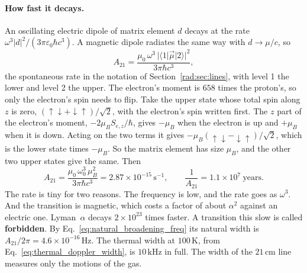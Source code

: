 \paragraph{How fast it decays.} An oscillating electric dipole of matrix element $d$ decays at the rate $\omega^3|d|^2/(3\pi\varepsilon_0\hbar c^3)$. A magnetic dipole radiates the same way with $d\to\mu/c$, so
\[
A_{21}=\frac{\mu_0\,\omega^3\,|\langle1|\vec\mu|2\rangle|^2}{3\pi\hbar c^3},
\]
the spontaneous rate in the notation of Section~\ref{rad:sec:lines}, with level 1 the lower and level 2 the upper. The electron's moment is $658$ times the proton's, so only the electron's spin needs to flip. Take the upper state whose total spin along $z$ is zero, $(\uparrow\downarrow+\downarrow\uparrow)/\sqrt2$, with the electron's spin written first. The $z$ part of the electron's moment, $-2\mu_BS_{e,z}/\hbar$, gives $-\mu_B$ when the electron is up and $+\mu_B$ when it is down. Acting on the two terms it gives $-\mu_B(\uparrow\downarrow-\downarrow\uparrow)/\sqrt2$, which is the lower state times $-\mu_B$. So the matrix element has size $\mu_B$, and the other two upper states give the same. Then
\begin{equation}
	\boxed{A_{21}=\frac{\mu_0\,\omega_0^3\,\mu_B^2}{3\pi\hbar c^3}=2.87\times10^{-15}\,\mathrm{s^{-1}},\qquad \frac{1}{A_{21}}=1.1\times10^7\ \text{years}.}
	\label{is:eq:A21}
\end{equation}
The rate is tiny for two reasons. The frequency is low, and the rate goes as $\omega^3$. And the transition is magnetic, which costs a factor of about $\alpha^2$ against an electric one. Lyman~$\alpha$ decays $2\times10^{23}$ times faster. A transition this slow is called \textbf{forbidden}. By Eq.~\eqref{eq:natural_broadening_freq} its natural width is $A_{21}/2\pi=4.6\times10^{-16}\,\mathrm{Hz}$. The thermal width at $100\,\mathrm K$, from Eq.~\eqref{eq:thermal_doppler_width}, is $10\,\mathrm{kHz}$ in full. The width of the $21\,\mathrm{cm}$ line measures only the motions of the gas.

